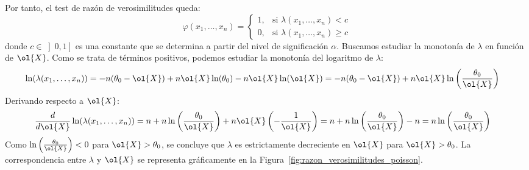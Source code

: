 \begin{ejemplo}
\begin{itemize}
\begin{itemize}
            Por tanto, el test de razón de verosimilitudes queda:
            \begin{equation*}
                \varphi(x_1, \dots, x_n) =
                \begin{cases}
                    1, & \text{si } \lambda(x_1, \dots, x_n) < c \\
                    0, & \text{si } \lambda(x_1, \dots, x_n) \geq c
                \end{cases}
            \end{equation*}
            donde $c\in \left]0,1\right]$ es una constante que se determina a partir del nivel de significación $\alpha$. Buscamos estudiar la monotonía de $\lambda$ en función de $\ol{X}$. Como se trata de términos positivos, podemos estudiar la monotonía del logaritmo de $\lambda$:
            \begin{align*}
                \ln(\lambda(x_1, \dots, x_n)) &= -n(\theta_0 - \ol{X}) + n\ol{X}\ln(\theta_0) - n\ol{X}\ln(\ol{X}) = -n(\theta_0 - \ol{X}) + n\ol{X}\ln\left(\frac{\theta_0}{\ol{X}}\right)
            \end{align*}
            Derivando respecto a $\ol{X}$:
            \begin{align*}
                \frac{d}{d\ol{X}} \ln(\lambda(x_1, \dots, x_n)) &= n + n\ln\left(\frac{\theta_0}{\ol{X}}\right) + n\ol{X}\left(-\frac{1}{\ol{X}}\right) = n + n\ln\left(\frac{\theta_0}{\ol{X}}\right) - n = n\ln\left(\frac{\theta_0}{\ol{X}}\right)
            \end{align*}
            Como $\ln\left(\frac{\theta_0}{\ol{X}}\right) < 0$ para $\ol{X} > \theta_0$, se concluye que $\lambda$ es estrictamente decreciente en $\ol{X}$ para $\ol{X} > \theta_0$. La correspondencia entre $\lambda$ y $\ol{X}$ se representa gráficamente en la Figura~\ref{fig:razon_verosimilitudes_poisson}.
            \begin{figure}[ht]
                \centering
\end{figure}
\end{itemize}
\end{itemize}
\end{ejemplo}
